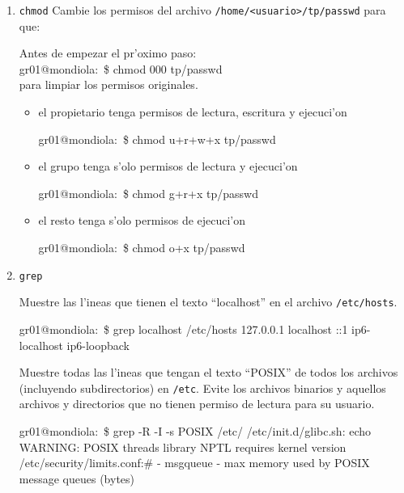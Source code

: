 \begin{enumerate}
\item \texttt{chmod} Cambie los permisos del archivo \texttt{/home/<usuario>/tp/passwd} para que:

\begin{envRespuesta}
Antes de empezar el pr'oximo paso: \\
gr01@mondiola:~\$ chmod 000 tp/passwd \\
para limpiar los permisos originales.
\end{envRespuesta}
\begin{itemize}
\item el propietario tenga permisos de lectura, escritura y ejecuci'on

\begin{envRespuesta}
gr01@mondiola:~\$ chmod u+r+w+x tp/passwd 
\end{envRespuesta}

\item el grupo tenga s'olo permisos de lectura y ejecuci'on

\begin{envRespuesta}
gr01@mondiola:~\$ chmod g+r+x tp/passwd 
\end{envRespuesta}

\item el resto tenga s'olo permisos de ejecuci'on

\begin{envRespuesta}
gr01@mondiola:~\$ chmod o+x tp/passwd 
\end{envRespuesta}
\end{itemize}

\item \texttt{grep}

Muestre las l'ineas que tienen el texto ``localhost'' en el archivo \texttt{/etc/hosts}.

\begin{envCodigo}
gr01@mondiola:~\$ grep localhost /etc/hosts
127.0.0.1	localhost
::1     ip6-localhost ip6-loopback
\end{envCodigo}

Muestre todas las l'ineas que tengan el texto ``POSIX'' de todos los archivos (incluyendo subdirectorios) en \texttt{/etc}.
Evite los archivos binarios y aquellos archivos y directorios que no tienen permiso de lectura para su usuario.

\begin{envCodigo}
gr01@mondiola:~\$ grep -R -I -s POSIX /etc/
/etc/init.d/glibc.sh:                echo WARNING: POSIX threads library NPTL 
                                     requires kernel version
/etc/security/limits.conf:#        - msgqueue - max memory used by POSIX 
                                     message queues (bytes)
\end{envCodigo}


\end{enumerate}
